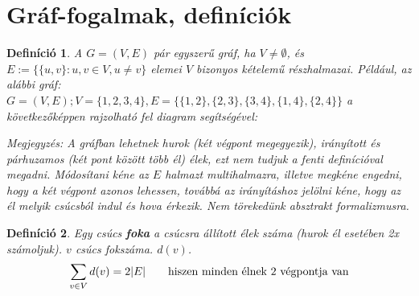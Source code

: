 \documentclass[a4paper,12pt,twoside]{book}
\newtheorem{defi}{Definíció}[chapter]
\theoremstyle{break}
\begin{document}
\section{Gráf-fogalmak, definíciók}

\SetUpEdge[lw         = 1.5pt,
            labelstyle = {draw,sloped}]
\tikzset{node distance = 2cm}

\begin{defi}
 A $G=(V,E)$ pár egyszerű gráf, ha $V\neq \emptyset$, és $E:=\{\{u,v\}:u,v\in V, u\neq v\}$ elemei $V$ bizonyos kételemű részhalmazai. Például, az alábbi gráf:\\
  $G=(V,E); V=\{1,2,3,4\}, E=\{\{1,2\}, \{2,3\}, \{3,4\}, \{1,4\}, \{2,4\}\}$ a következőképpen rajzolható fel diagram segítségével:
\begin{center}
\end{center}
\emph{Megjegyzés}: A gráfban lehetnek hurok (két végpont megegyezik), irányított és párhuzamos (két pont között több él) élek, ezt nem tudjuk a fenti definícióval megadni. Módosítani kéne az $E$ halmazt multihalmazra, illetve megkéne engedni, hogy a két végpont azonos lehessen, továbbá az irányításhoz jelölni kéne, hogy az él melyik csúcsból indul és hova érkezik. Nem törekedünk absztrakt formalizmusra.
\end{defi}

\begin{defi}
 Egy csúcs \textbf{foka} a csúcsra állított élek száma (hurok él esetében 2x számoljuk). $v$ csúcs fokszáma. $d(v)$.\\
 \[\sum_{v\in V} d(v) = 2|E| \qquad \hbox{hiszen minden élnek 2 végpontja van}\]
\end{defi}
\end{document}
